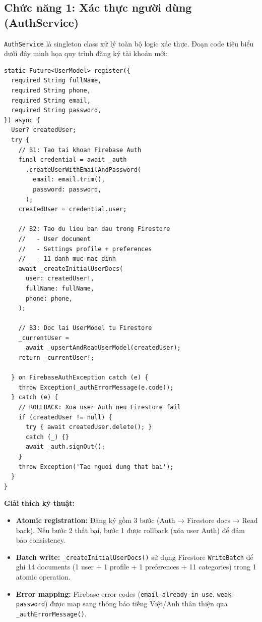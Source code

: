 \subsection{Chức năng 1: Xác thực người dùng (AuthService)}

\texttt{AuthService} là singleton class xử lý toàn bộ logic xác thực. Đoạn code tiêu biểu dưới đây minh họa quy trình đăng ký tài khoản mới:

\begin{lstlisting}[caption={AuthService.register() --- Đăng ký tài khoản với rollback}]
static Future<UserModel> register({
  required String fullName,
  required String phone,
  required String email,
  required String password,
}) async {
  User? createdUser;
  try {
    // B1: Tao tai khoan Firebase Auth
    final credential = await _auth
      .createUserWithEmailAndPassword(
        email: email.trim(),
        password: password,
      );
    createdUser = credential.user;

    // B2: Tao du lieu ban dau trong Firestore
    //   - User document
    //   - Settings profile + preferences
    //   - 11 danh muc mac dinh
    await _createInitialUserDocs(
      user: createdUser!,
      fullName: fullName,
      phone: phone,
    );

    // B3: Doc lai UserModel tu Firestore
    _currentUser =
      await _upsertAndReadUserModel(createdUser);
    return _currentUser!;

  } on FirebaseAuthException catch (e) {
    throw Exception(_authErrorMessage(e.code));
  } catch (e) {
    // ROLLBACK: Xoa user Auth neu Firestore fail
    if (createdUser != null) {
      try { await createdUser.delete(); }
      catch (_) {}
      await _auth.signOut();
    }
    throw Exception('Tao nguoi dung that bai');
  }
}
\end{lstlisting}

\textbf{Giải thích kỹ thuật:}
\begin{itemize}
  \item \textbf{Atomic registration:} Đăng ký gồm 3 bước (Auth → Firestore docs → Read back). Nếu bước 2 thất bại, bước 1 được rollback (xóa user Auth) để đảm bảo consistency.
  \item \textbf{Batch write:} \texttt{\_createInitialUserDocs()} sử dụng Firestore \texttt{WriteBatch} để ghi 14 documents (1 user + 1 profile + 1 preferences + 11 categories) trong 1 atomic operation.
  \item \textbf{Error mapping:} Firebase error codes (\texttt{email-already-in-use}, \texttt{weak-password}) được map sang thông báo tiếng Việt/Anh thân thiện qua \texttt{\_authErrorMessage()}.
\end{itemize}

